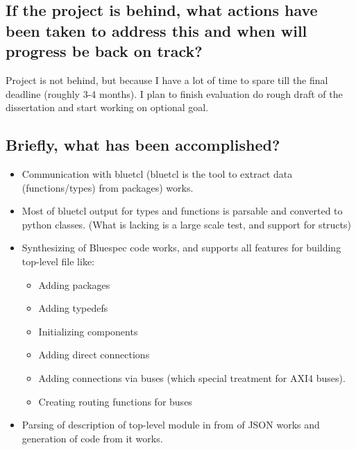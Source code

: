 \documentclass[14pt]{article}
\begin{document}
    \subsection{If the project is behind, what actions have been taken to address this and when will progress be back on track?}
        Project is not behind, but because I have a lot of time to spare till the final deadline (roughly 3-4 months). I plan to finish evaluation do rough draft of the dissertation and start working on optional goal. 
    \subsection{Briefly, what has been accomplished?}
    \begin{itemize}
        \item Communication with bluetcl (bluetcl is the tool to extract data (functions/types) from packages) works. 
        \item Most of bluetcl output for types and functions is parsable and converted to python classes. (What is lacking is a large scale test, and support for structs)
        \item Synthesizing of Bluespec code works, and supports all features for building top-level file like:
        \begin{itemize}
            \item Adding packages
            \item Adding typedefs
            \item Initializing components
            \item Adding direct connections
            \item Adding connections via buses (which special treatment for AXI4 buses).
            \item Creating routing functions for buses
        \end{itemize}
        \item Parsing of description of top-level module in from of JSON works and generation of code from it works.
    \end{itemize}
        
\end{document}
